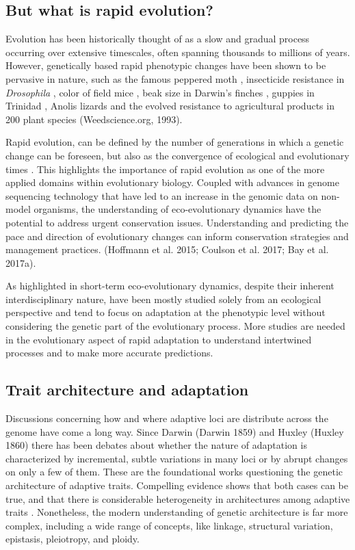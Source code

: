 \documentclass{article}
\begin{document}
\subsection{But what is rapid evolution?}
Evolution has been historically thought of as a slow and gradual process occurring over extensive timescales, often spanning thousands to millions of years. However, genetically based rapid phenotypic changes have been shown to be pervasive in nature, such as the famous peppered moth \citep{Cook2013-bs}, insecticide resistance in \textit{Drosophila} \citep{Daborn2002-is}, color of field mice \citep{Vignieri2010-if}, beak size in Darwin’s finches \citep{Grant2008-uc}, guppies in Trinidad \citep{Kemp2009-ji}, Anolis lizards \citep{Losos2009-vq} and the evolved resistance to agricultural products in 200 plant species (Weedscience.org, 1993). 

Rapid evolution, can be defined by the number of generations in which a genetic change can be foreseen, but also as the convergence of ecological and evolutionary times \citep{Hairston2005-qo}. This highlights the importance of rapid evolution as one of the more applied domains within evolutionary biology. Coupled with advances in genome sequencing technology that have led to an increase in the genomic data on non-model organisms, the understanding of eco-evolutionary dynamics have the potential to address urgent conservation issues. Understanding and predicting the pace and direction of evolutionary changes can inform conservation strategies and management practices. (Hoffmann  et al. 2015; Coulson et al. 2017; Bay et al. 2017a).

As highlighted in \citep{Yamamichi2022-yj} short-term eco-evolutionary dynamics, despite their inherent interdisciplinary nature, have been mostly studied solely from an ecological perspective and tend to focus on adaptation at the phenotypic level without considering the genetic part of the evolutionary process. More studies are needed in the evolutionary aspect of rapid adaptation to understand intertwined processes and to make more accurate predictions.

\subsection{Trait architecture and adaptation}

Discussions concerning  how and where adaptive loci are distribute across the genome have come a long way. Since Darwin (Darwin 1859) and Huxley (Huxley 1860) there has been debates about whether the nature of adaptation is characterized by incremental, subtle variations in many loci or by abrupt changes on only a few of them. These are the foundational works questioning the genetic architecture of adaptive traits. Compelling evidence shows that both cases can be true, and that there is considerable heterogeneity in architectures among adaptive traits \citep{Orr1992-xj, Orr1998-pr}. Nonetheless, the modern understanding of genetic architecture is far more complex, including a wide range of concepts, like linkage, structural variation, epistasis, pleiotropy, and ploidy. 
\end{document}
